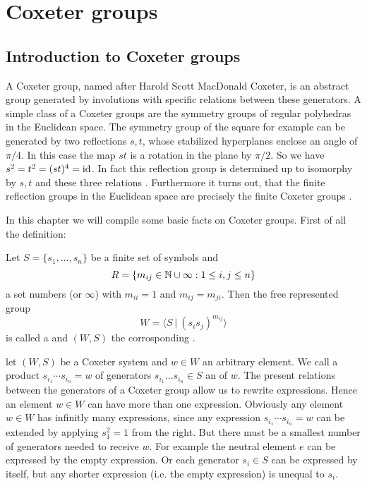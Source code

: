 \section{Coxeter groups}

\subsection{Introduction to Coxeter groups}

A Coxeter group, named after Harold Scott MacDonald Coxeter, is an abstract group generated by involutions with specific relations between these generators. A simple class of a Coxeter groups are the symmetry groups of regular polyhedras in the Euclidean space. The symmetry group of the square for example can be generated by two reflections $s,t$, whose stabilized hyperplanes enclose an angle of $\pi / 4$. In this case the map $st$ is a rotation in the plane by $\pi / 2$. So we have $s^2 = t^2 = (st)^4 = \operatorname{id}$. In fact this reflection group is determined up to isomorphy by $s,t$ and these three relations \cite[Theorem 1.9]{humphreys:coxeter}. Furthermore it turns out, that the finite reflection groups in the Euclidean space are precisely the finite Coxeter groups \cite[Theorem 6.4]{humphreys:coxeter}.

In this chapter we will compile some basic facts on Coxeter groups. First of all the definition:

\begin{defi}
	\label{coxeter-system}
	Let $S = \{ s_1, \ldots, s_n \}$ be a finite set of symbols and
	$$R = \{ m_{ij} \in \mathbb{N} \cup \infty : 1 \leq i,j \leq n \}$$
	a set numbers (or $\infty$) with $m_{ii} = 1$ and $m_{ij} = m_{ji}$. Then the free represented group
	$$W = \langle S \ | \ (s_i s_j)^{m_{ij}} \rangle$$
	is called a  and $(W,S)$ the corrosponding .
\end{defi}

let $(W,S)$ be a Coxeter system and $w \in W$ an arbitrary element. We call a product $s_{i_1} \cdots s_{i_n} = w$ of generators $s_{i_1} \ldots s_{i_n} \in S$ an  of $w$. The present relations between the generators of a Coxeter group allow us to rewrite expressions. Hence an element $w \in W$ can have more than one expression. Obviously any element $w \in W$ has infinitly many expressions, since any expression $s_{i_1} \cdots s_{i_n} = w$ can be extended by applying $s_1^2 = 1$ from the right. But there must be a smallest number of generators needed to receive $w$. For example the neutral element $e$ can be expressed by the empty expression. Or each generator $s_i \in S$ can be expressed by itself, but any shorter expression (i.e. the empty expression) is unequal to $s_i$.


